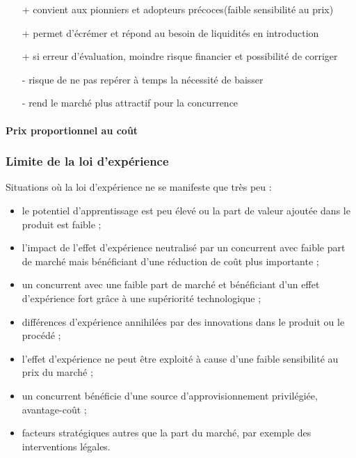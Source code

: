 			\begin{itemize}
				\item[+] convient aux pionniers et adopteurs précoces(faible sensibilité au prix)
				\item[+] permet d'écrémer et répond au besoin de liquidités en introduction 
				\item[+] si erreur d'évaluation, moindre risque financier et possibilité de corriger 
				\item[-] risque de ne pas repérer à temps la nécessité de baisser
				\item[-] rend le marché plus attractif pour la concurrence
			\end{itemize}
		
			\paragraph{Prix proportionnel au coût}
		
		
		
			\subsubsection{Limite de la loi d'expérience}
		
		Situations où la loi d'expérience ne se manifeste que très peu :
		\begin{itemize}
			\item le potentiel d'apprentissage est peu élevé ou la part de valeur ajoutée dans le produit est faible ;
			\item l'impact de l'effet d'expérience neutralisé par un concurrent avec faible part de marché mais bénéficiant d'une réduction de coût plus importante ;
			\item un concurrent avec une faible part de marché et bénéficiant d'un effet d'expérience fort grâce à une supériorité technologique ;
			\item différences d'expérience annihilées par des innovations dans le produit ou le procédé ;
			\item l'effet d'expérience ne peut être exploité à cause d'une faible sensibilité au prix du marché ;
			\item un concurrent bénéficie d'une source d'approvisionnement privilégiée, avantage-coût ;
			\item facteurs stratégiques autres que la part du marché, par exemple des interventions légales.
		\end{itemize}
		
		
